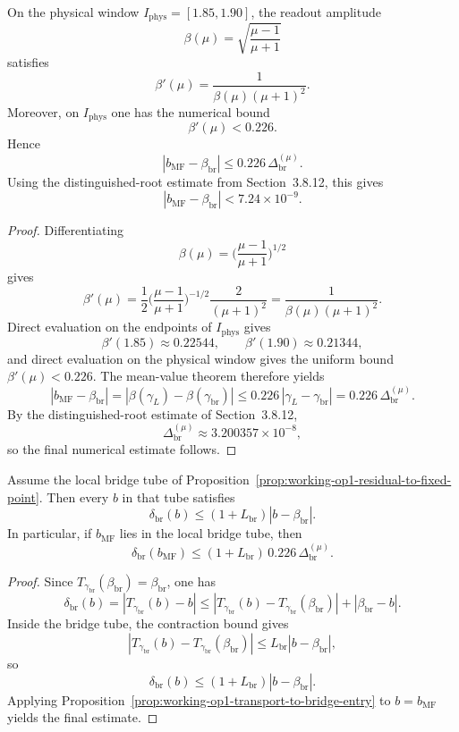 \begin{proposition}
\label{prop:working-op1-transport-to-bridge-entry}
On the physical window \(I_{\mathrm{phys}}=[1.85,1.90]\), the readout amplitude
\[
 \beta(\mu)=\sqrt{\frac{\mu-1}{\mu+1}}
\]
satisfies
\[
 \beta'(\mu)=\frac{1}{\beta(\mu)(\mu+1)^2}.
\]
Moreover, on \(I_{\mathrm{phys}}\) one has the numerical bound
\[
 \beta'(\mu)<0.226.
\]
Hence
\[
 |b_{\mathrm{MF}}-\beta_{\mathrm{br}}|
 \le
 0.226\,\Delta^{(\mu)}_{\mathrm{br}}.
\]
Using the distinguished-root estimate from Section~3.8.12, this gives
\[
 |b_{\mathrm{MF}}-\beta_{\mathrm{br}}|
 <7.24\times10^{-9}.
\]
\end{proposition}

\begin{proof}
Differentiating
\[
 \beta(\mu)=\biggl(\frac{\mu-1}{\mu+1}\biggr)^{1/2}
\]
gives
\[
 \beta'(\mu)
 =
 \frac{1}{2}\biggl(\frac{\mu-1}{\mu+1}\biggr)^{-1/2}\frac{2}{(\mu+1)^2}
 =
 \frac{1}{\beta(\mu)(\mu+1)^2}.
\]
Direct evaluation on the endpoints of \(I_{\mathrm{phys}}\) gives
\[
 \beta'(1.85)\approx 0.22544,
 \qquad
 \beta'(1.90)\approx 0.21344,
\]
and direct evaluation on the physical window gives the uniform bound \(\beta'(\mu)<0.226\). The mean-value theorem therefore yields
\[
 |b_{\mathrm{MF}}-\beta_{\mathrm{br}}|
 =
 |\beta(\gamma_L)-\beta(\gamma_{\mathrm{br}})|
 \le
 0.226\,|\gamma_L-\gamma_{\mathrm{br}}|
 =
 0.226\,\Delta^{(\mu)}_{\mathrm{br}}.
\]
By the distinguished-root estimate of Section~3.8.12,
\[
 \Delta^{(\mu)}_{\mathrm{br}}
 \approx 3.200357\times10^{-8},
\]
so the final numerical estimate follows.
\end{proof}

\begin{proposition}
\label{prop:working-op1-rounded-defect}
Assume the local bridge tube of Proposition~\ref{prop:working-op1-residual-to-fixed-point}. Then every \(b\) in that tube satisfies
\[
 \delta_{\mathrm{br}}(b)
 \le
 (1+L_{\mathrm{br}})|b-\beta_{\mathrm{br}}|.
\]
In particular, if \(b_{\mathrm{MF}}\) lies in the local bridge tube, then
\[
 \delta_{\mathrm{br}}(b_{\mathrm{MF}})
 \le
 (1+L_{\mathrm{br}})\,0.226\,\Delta^{(\mu)}_{\mathrm{br}}.
\]
\end{proposition}

\begin{proof}
Since \(T_{\gamma_{\mathrm{br}}}(\beta_{\mathrm{br}})=\beta_{\mathrm{br}}\), one has
\[
 \delta_{\mathrm{br}}(b)
 =
 |T_{\gamma_{\mathrm{br}}}(b)-b|
 \le
 |T_{\gamma_{\mathrm{br}}}(b)-T_{\gamma_{\mathrm{br}}}(\beta_{\mathrm{br}})|
 +|\beta_{\mathrm{br}}-b|.
\]
Inside the bridge tube, the contraction bound gives
\[
 |T_{\gamma_{\mathrm{br}}}(b)-T_{\gamma_{\mathrm{br}}}(\beta_{\mathrm{br}})|
 \le
 L_{\mathrm{br}}|b-\beta_{\mathrm{br}}|,
\]
so
\[
 \delta_{\mathrm{br}}(b)
 \le
 (1+L_{\mathrm{br}})|b-\beta_{\mathrm{br}}|.
\]
Applying Proposition~\ref{prop:working-op1-transport-to-bridge-entry} to \(b=b_{\mathrm{MF}}\) yields the final estimate.
\end{proof}

